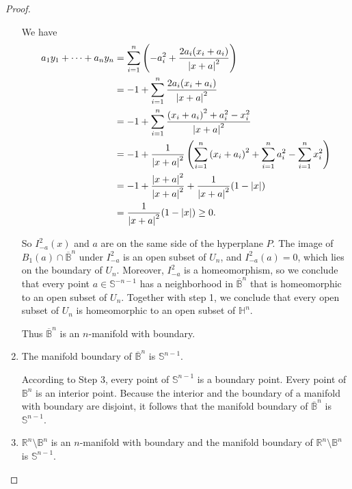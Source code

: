 \begin{proof}
\begin{enumerate}[label={\textbf{Step \arabic*.}},itemindent=1cm]
		      We have
		      \begingroup
		      \allowdisplaybreaks{}
		      \begin{align*}
			      a_{1}y_{1} + \cdots + a_{n}y_{n} & = \sum^{n}_{i=1}\left(-a_{i}^{2} + \frac{2a_{i}(x_{i} + a_{i})}{\left\vert{x + a}\right\vert^{2}}\right)                                                \\
			                                       & = -1 + \sum^{n}_{i=1}\frac{2a_{i}(x_{i} + a_{i})}{\left\vert{x + a}\right\vert^{2}}                                                                     \\
			                                       & = -1 + \sum^{n}_{i=1}\frac{{(x_{i} + a_{i})}^{2} + a_{i}^{2} - x_{i}^{2}}{\left\vert{x + a}\right\vert^{2}}                                             \\
			                                       & = -1 + \frac{1}{\left\vert{x + a}\right\vert^{2}}\left( \sum^{n}_{i=1}{(x_{i} + a_{i})}^{2} + \sum^{n}_{i=1}a_{i}^{2} - \sum^{n}_{i=1}x_{i}^{2} \right) \\
			                                       & = -1 + \frac{\left\vert{x+a}\right\vert^{2}}{\left\vert{x+a}\right\vert^{2}} + \frac{1}{\left\vert{x+a}\right\vert^{2}}(1 - \left\vert{x}\right\vert)                                                      \\
			                                       & = \frac{1}{\left\vert{x+a}\right\vert^{2}}(1 - \left\vert{x}\right\vert) \geq 0.
		      \end{align*}
		      \endgroup

		      So $I^{2}_{-a}(x)$ and $a$ are on the same side of the hyperplane $P$. The image of $B_{1}(a)\cap \overline{\mathbb{B}}^{n}$ under $I^{2}_{-a}$ is an open subset of $U_{n}$, and $I^{2}_{-a}(a) = 0$, which lies on the boundary of $U_{n}$. Moreover, $I^{2}_{-a}$ is a homeomorphism, so we conclude that every point $a\in\mathbb{S}^{-n-1}$ has a neighborhood in $\overline{\mathbb{B}}^{n}$ that is homeomorphic to an open subset of $U_{n}$. Together with step 1, we conclude that every open subset of $U_{n}$ is homeomorphic to an open subset of $\mathbb{H}^{n}$.

		      Thus $\overline{\mathbb{B}}^{n}$ is an $n$-manifold with boundary.
		\item The manifold boundary of $\overline{\mathbb{B}}^{n}$ is $\mathbb{S}^{n-1}$.

		      According to Step 3, every point of $\mathbb{S}^{n-1}$ is a boundary point. Every point of $\mathbb{B}^{n}$ is an interior point. Because the interior and the boundary of a manifold with boundary are disjoint, it follows that the manifold boundary of $\overline{\mathbb{B}}^{n}$ is $\mathbb{S}^{n-1}$.
		\item $\mathbb{R}^{n}\setminus \mathbb{B}^{n}$ is an $n$-manifold with boundary and the manifold boundary of $\mathbb{R}^{n}\setminus \mathbb{B}^{n}$ is $\mathbb{S}^{n-1}$.


\end{enumerate}
\end{proof}
